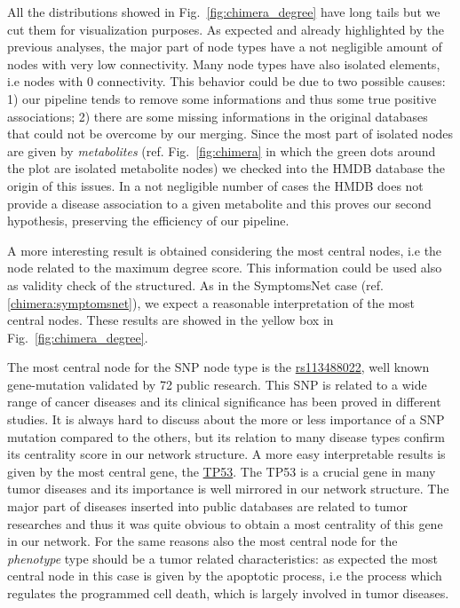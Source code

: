 \documentclass{standalone}
\begin{document}
All the distributions showed in Fig.~\ref{fig:chimera_degree} have long tails but we cut them for visualization purposes.
As expected and already highlighted by the previous analyses, the major part of node types have a not negligible amount of nodes with very low connectivity.
Many node types have also isolated elements, i.e nodes with 0 connectivity.
This behavior could be due to two possible causes: 1) our pipeline tends to remove some informations and thus some true positive associations; 2) there are some missing informations in the original databases that could not be overcome by our merging.
Since the most part of isolated nodes are given by \emph{metabolites} (ref. Fig.~\ref{fig:chimera} in which the green dots around the plot are isolated metabolite nodes) we checked into the HMDB database the origin of this issues.
In a not negligible number of cases the HMDB does not provide a disease association to a given metabolite and this proves our second hypothesis, preserving the efficiency of our pipeline.

A more interesting result is obtained considering the most central nodes, i.e the node related to the maximum degree score.
This information could be used also as validity check of the structured.
As in the \textsf{SymptomsNet} case (ref. \ref{chimera:symptomsnet}), we expect a reasonable interpretation of the most central nodes.
These results are showed in the yellow box in Fig.~\ref{fig:chimera_degree}.

The most central node for the SNP node type is the \href{https://www.ncbi.nlm.nih.gov/snp/rs113488022}{\textsf{rs113488022}}, well known gene-mutation validated by 72 public research.
This SNP is related to a wide range of cancer diseases and its clinical significance has been proved in different studies.
It is always hard to discuss about the more or less importance of a SNP mutation compared to the others, but its relation to many disease types confirm its centrality score in our network structure.
A more easy interpretable results is given by the most central gene, the \href{https://ghr.nlm.nih.gov/gene/TP53}{\textsf{TP53}}.
The \textsf{TP53} is a crucial gene in many tumor diseases and its importance is well mirrored in our network structure.
The major part of diseases inserted into public databases are related to tumor researches and thus it was quite obvious to obtain a most centrality of this gene in our network.
For the same reasons also the most central node for the \emph{phenotype} type should be a tumor related characteristics: as expected the most central node in this case is given by the \textsf{apoptotic process}, i.e the process which regulates the programmed cell death, which is largely involved in tumor diseases.
\end{document}
